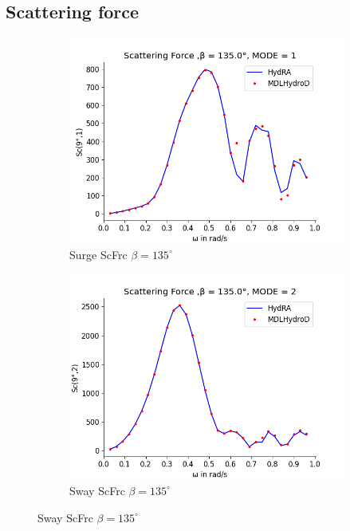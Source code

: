 \subsection{Scattering force}
\begin{figure}[H]
    \centering
    \begin{subfigure}[b]{0.49\textwidth}
        \includegraphics[width=\textwidth]{plots/kvlcc/sc/sc1.png}
        \caption{Surge ScFrc $\beta = 135^{\circ}$}
    \end{subfigure}
    \begin{subfigure}[b]{0.49\textwidth}
        \includegraphics[width=\textwidth]{plots/kvlcc/sc/sc2.png}
        \caption{Sway ScFrc $\beta = 135^{\circ}$}
    \end{subfigure}

\end{figure}

